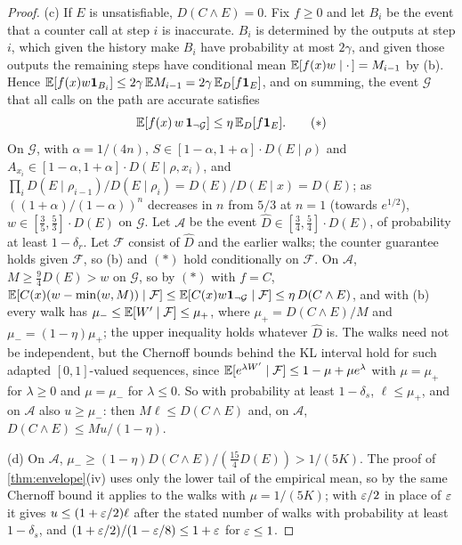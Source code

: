 \begin{proof}
(c) If $E$ is unsatisfiable, $D(C\wedge E)=0$. Fix $f\ge0$ and let $B_i$ be the
event that a counter call at step $i$ is inaccurate. $B_i$ is determined by the
outputs at step $i$, which given the history make $B_i$ have probability at most
$2\gamma$, and given those outputs the remaining steps have conditional mean
$\mathbb{E}[f(x)w\mid\cdot\,]=M_{i-1}$ by (b). Hence $\mathbb{E}[f(x)w\mathbf{1}_{B_i}]\le2\gamma\,\mathbb{E} M_{i-1}
=2\gamma\,\mathbb{E}_D[f\mathbf{1}_E]$, and on summing, the event $\mathcal G$ that all calls on the
path are accurate satisfies
\[
\mathbb{E}[f(x)\,w\,\mathbf{1}_{\neg\mathcal G}]\le\eta\,\mathbb{E}_D[f\mathbf{1}_E].\tag{$\ast$}
\]
On $\mathcal G$, with $\alpha=1/(4n)$, $S\in[1-\alpha,1+\alpha]\cdot D(E\mid\rho)$ and
$A_{x_i}\in[1-\alpha,1+\alpha]\cdot D(E\mid\rho,x_i)$, and $\prod_iD(E\mid\rho_{i-1})/
D(E\mid\rho_i)=D(E)/D(E\mid x)=D(E)$; as $((1+\alpha)/(1-\alpha))^n$ decreases in $n$
from $5/3$ at $n=1$ (towards $e^{1/2}$), $w\in[\frac35,\frac53]\cdot D(E)$ on $\mathcal G$.
Let $\mathcal A$ be the event $\hat D\in[\frac34,\frac54]\cdot D(E)$, of probability at
least $1-\delta_r$. Let $\mathcal F$ consist of $\hat D$ and the earlier walks; the
counter guarantee holds given $\mathcal F$, so (b) and $(\ast)$ hold conditionally on
$\mathcal F$. On $\mathcal A$, $M\ge\frac94D(E)>w$ on $\mathcal G$, so by $(\ast)$ with
$f=C$, $\mathbb{E}[C(x)(w-\min(w,M))\mid\mathcal F]\le\mathbb{E}[C(x)w\mathbf{1}_{\neg\mathcal G}\mid\mathcal
F]\le\eta\,D(C\wedge E)$, and with (b) every walk has $\mu_-\le\mathbb{E}[W'\mid\mathcal
F]\le\mu_+$, where $\mu_+=D(C\wedge E)/M$ and $\mu_-=(1-\eta)\mu_+$; the upper
inequality holds whatever $\hat D$ is. The walks need not be independent, but the
Chernoff bounds behind the KL interval hold for such adapted $[0,1]$-valued
sequences, since $\mathbb{E}[e^{\lambda W'}\mid\mathcal F]\le1-\mu+\mu e^\lambda$ with $\mu=\mu_+$
for $\lambda\ge0$ and $\mu=\mu_-$ for $\lambda\le0$. So with probability at least
$1-\delta_s$, $\ell\le\mu_+$, and on $\mathcal A$ also $u\ge\mu_-$: then $M\ell\le
D(C\wedge E)$ and, on $\mathcal A$, $D(C\wedge E)\le Mu/(1-\eta)$.

(d) On $\mathcal A$, $\mu_-\ge(1-\eta)D(C\wedge E)/(\frac{15}4D(E))>1/(5K)$. The proof
of \cref{thm:envelope}(iv) uses only the lower tail of the empirical mean, so by the
same Chernoff bound it applies to the walks with $\mu=1/(5K)$; with $\varepsilon/2$ in place
of $\varepsilon$ it gives $u\le(1+\varepsilon/2)\ell$ after the stated number of walks with
probability at least $1-\delta_s$, and $(1+\varepsilon/2)/(1-\varepsilon/8)\le1+\varepsilon$ for $\varepsilon\le1$.
\end{proof}

